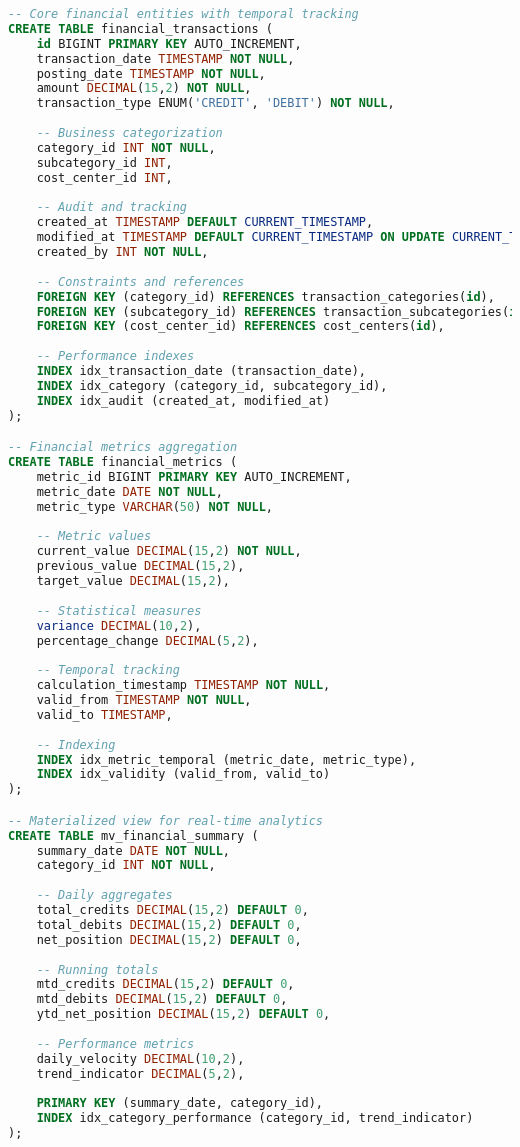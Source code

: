 \documentclass[conference]{IEEEtran}
\begin{document}
\begin{lstlisting}[language=SQL, caption=Core Financial Schema Implementation]
-- Core financial entities with temporal tracking
CREATE TABLE financial_transactions (
    id BIGINT PRIMARY KEY AUTO_INCREMENT,
    transaction_date TIMESTAMP NOT NULL,
    posting_date TIMESTAMP NOT NULL,
    amount DECIMAL(15,2) NOT NULL,
    transaction_type ENUM('CREDIT', 'DEBIT') NOT NULL,
    
    -- Business categorization
    category_id INT NOT NULL,
    subcategory_id INT,
    cost_center_id INT,
    
    -- Audit and tracking
    created_at TIMESTAMP DEFAULT CURRENT_TIMESTAMP,
    modified_at TIMESTAMP DEFAULT CURRENT_TIMESTAMP ON UPDATE CURRENT_TIMESTAMP,
    created_by INT NOT NULL,
    
    -- Constraints and references
    FOREIGN KEY (category_id) REFERENCES transaction_categories(id),
    FOREIGN KEY (subcategory_id) REFERENCES transaction_subcategories(id),
    FOREIGN KEY (cost_center_id) REFERENCES cost_centers(id),
    
    -- Performance indexes
    INDEX idx_transaction_date (transaction_date),
    INDEX idx_category (category_id, subcategory_id),
    INDEX idx_audit (created_at, modified_at)
);

-- Financial metrics aggregation
CREATE TABLE financial_metrics (
    metric_id BIGINT PRIMARY KEY AUTO_INCREMENT,
    metric_date DATE NOT NULL,
    metric_type VARCHAR(50) NOT NULL,
    
    -- Metric values
    current_value DECIMAL(15,2) NOT NULL,
    previous_value DECIMAL(15,2),
    target_value DECIMAL(15,2),
    
    -- Statistical measures
    variance DECIMAL(10,2),
    percentage_change DECIMAL(5,2),
    
    -- Temporal tracking
    calculation_timestamp TIMESTAMP NOT NULL,
    valid_from TIMESTAMP NOT NULL,
    valid_to TIMESTAMP,
    
    -- Indexing
    INDEX idx_metric_temporal (metric_date, metric_type),
    INDEX idx_validity (valid_from, valid_to)
);

-- Materialized view for real-time analytics
CREATE TABLE mv_financial_summary (
    summary_date DATE NOT NULL,
    category_id INT NOT NULL,
    
    -- Daily aggregates
    total_credits DECIMAL(15,2) DEFAULT 0,
    total_debits DECIMAL(15,2) DEFAULT 0,
    net_position DECIMAL(15,2) DEFAULT 0,
    
    -- Running totals
    mtd_credits DECIMAL(15,2) DEFAULT 0,
    mtd_debits DECIMAL(15,2) DEFAULT 0,
    ytd_net_position DECIMAL(15,2) DEFAULT 0,
    
    -- Performance metrics
    daily_velocity DECIMAL(10,2),
    trend_indicator DECIMAL(5,2),
    
    PRIMARY KEY (summary_date, category_id),
    INDEX idx_category_performance (category_id, trend_indicator)
);
\end{lstlisting}
\end{document}
